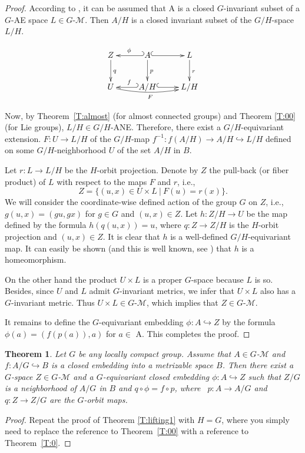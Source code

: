 \documentclass{amsart}
\newtheorem{theorem}{Theorem}[section]
\begin{document}
\begin{proof} According to \cite[Theorem~6.1]{ant:elena}, it can be assumed that A is a
closed $G$-invariant subset of a $G$-AE space $L\in G$-$\mathcal M$. Then $A/H$ is  a closed invariant
subset of the $G/H$-space $L/H$.

\begin{displaymath}
 \xymatrix{ Z  \ar[d]^{q} & A \ar @{_{(}->} [l]_{\phi} \ar @{^{(}->} [r]^{} \ar[d]^{p}
& L  \ar[d]^{r}  \\
U  \ar @/_/[rr]_F  & A/H \ar @{_{(}->} [l]_{f} \ar @{^{(}->} [r]^{}  & L/H }
\end{displaymath}

\medskip

\noindent 
Now, by Theorem~\ref{T:almost} (for almost connected groups) and Theorem
\ref{T:00} (for Lie groups), $L/H\in G/H$-ANE. Therefore, there exist a $G/H$-equivariant
extension. $F:U\to L/H$ of the $G/H$-map
$f^{-1}:f(A/H)\to A/H \hookrightarrow L/H$ defined on some $G/H$-neighborhood $U$ of the set $A/H$ in $B$. 

Let $r:L \to L/H$ be the $H$-orbit projection. Denote by
$Z$ the pull-back (or fiber product) of  $L$  with respect to the maps $F$ and $r$, i.e.,
$$ Z=\{(u,x)\in U\times L\ | \  F(u)=r(x)\}.$$
 We will consider the coordinate-wise defined action of the group $G$ on $Z$, i.e., $g(u,x)=(gu,gx)$ for
$g\in G$ and $(u, x)\in Z$. Let $h:Z/H\to U$ be the map defined by the formula $h(q(u,x))=u$, where
$q:Z\to Z/H$ is the $H$-orbit projection and $(u,x)\in  Z$. It is clear that $h$ is a well-defined
$G/H$-equivariant map. It can easily be shown (and this is well known, see \cite[Ch.4,
Proposition~4.1]{huse:94}) that $h$ is a homeomorphism.

 On the other hand the product $U\times
L$ is a proper $G$-space because $L$ is so. Besides, since $U$ and $L$ admit $G$-invariant metrics,
we infer that $U\times L$ also has a $G$-invariant metric. Thus $U\times L\in G$-$\mathcal M$, which
implies that $Z\in G$-$\mathcal M$.


It remains to define the $G$-equivariant embedding $\phi:A \hookrightarrow Z$ by the formula
$\phi (a)=(f(p(a)),a)$ for $a\in$ A. This completes the proof.
\end{proof}

\medskip

\begin{theorem}\label{T:anygroup}
 Let   $G$ be any locally compact   group. Assume  that    $A\in G$-$\mathcal M$ and
 $f:A/G\hookrightarrow  B$ is a closed embedding into  a metrizable  space $B$. Then there exist
 a $G$-space  $Z\in G$-$\mathcal M$ and a $G$-equivariant closed embedding
 $\phi:A\hookrightarrow Z$
such that $Z/G$ is a  neighborhood of $A/G$ in $B$
and $q\circ\phi=f\circ p$, where \ $p:A\to A/G$ and \  $q:Z\to
Z/G$ are the $G$-orbit maps.
\end{theorem}
\begin{proof} Repeat the proof of Theorem \ref{T:lifting1} with $H=G$, where you simply  need to replace the reference to Theorem~\ref{T:00} with a reference to Theorem~\ref{T:0}.
\end{proof}
\end{document}
